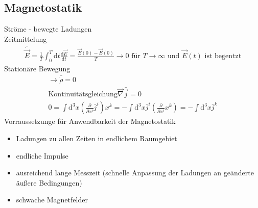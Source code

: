 \documentclass[a4paper]{article}
\begin{document}
\subsection{Magnetostatik}
Ströme - bewegte Ladungen\\
Zeitmittelung
\begin{align}
\bar{\dot{\vec{E}}}=\frac{1}{T}\int_0^T \mathrm{d}t
\frac{\mathrm{d}\vec{E}}{\mathrm{d}t}=\frac{\vec{E}(0)-\vec{E}(0)}{T}\rightarrow 0 \text{ für }
T\rightarrow \infty \text{ und } \vec{E}(t) \text{ ist begentzt}
\end{align}
Stationäre Bewegung
\begin{align}
\rightarrow \bar{\dot{\rho}}=0\\
\text{Kontinuitätsgleichung} \vec{\nabla}\bar{{\vec{j}}}=0\\
0=\int \mathrm{d}^3x\left( \frac{\partial}{\partial x^i}\bar{j}^i \right)x^k=
-\int \mathrm{d}^3x \bar{j}^i \left( \frac{\partial}{\partial x^i}x^k \right)=-\int \mathrm{d}^3x
\bar{j}^k
\end{align}
Vorraussetzunge für Anwendbarkeit der Magnetostatik
\begin{itemize}
  \item Ladungen zu allen Zeiten in endlichem Raumgebiet
  \item endliche Impulse
  \item ausreichend lange Messzeit (schnelle Anpassung der Ladungen an geänderte
  äußere Bedingungen)
  \item schwache Magnetfelder
\end{itemize}
\end{document}
